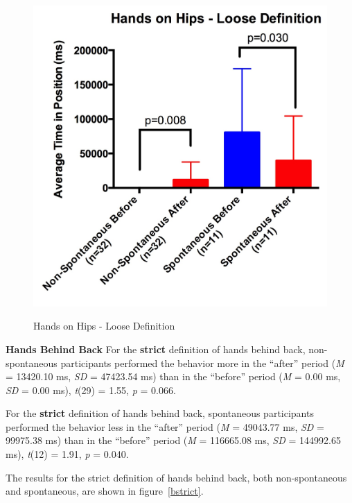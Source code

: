 \documentclass{acm_proc_article-sp}
\begin{document}
\begin{figure}[t!]
\centering
 \includegraphics[width=1.00\linewidth]{images/hloose.jpg}\\
 \caption{Hands on Hips - Loose Definition}
 \label{hloose} %
\end{figure}

\textbf{Hands Behind Back}
For the \textbf{strict} definition of hands behind back, non-spontaneous participants performed the behavior more in the ``after'' period (\textit{M} = 13420.10 ms, \textit{SD} = 47423.54 ms) than in the ``before'' period (\textit{M} = 0.00 ms, \textit{SD} = 0.00 ms), \textit{t}(29) = 1.55, \textit{p} = 0.066.

For the \textbf{strict} definition of hands behind back, spontaneous participants performed the behavior less in the ``after'' period (\textit{M} = 49043.77 ms, \textit{SD} = 99975.38 ms) than in the ``before'' period (\textit{M} = 116665.08 ms, \textit{SD} = 144992.65 ms), \textit{t}(12) = 1.91, \textit{p} = 0.040.

The results for the strict definition of hands behind back, both non-spontaneous and spontaneous, are shown in figure~\ref{bstrict}.
\end{document}
